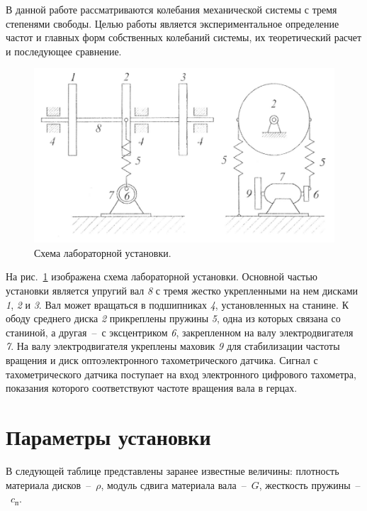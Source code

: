 \documentclass[12pt, a4paper]{article}
\begin{document}
    В данной работе рассматриваются колебания механической системы с тремя степенями свободы. Целью работы является экспериментальное определение частот и главных форм собственных колебаний системы, их теоретический расчет и последующее сравнение.
    
    \begin{figure} [h]
        \centering
        \includegraphics [width = 12cm] {Lab_4_1.png}
        \caption{\centering Схема лабораторной установки.}
        \label{im1}
    \end{figure}
    
    На рис.~\ref{im1} изображена схема лабораторной установки. Основной частью установки является упругий вал \textit{8} с тремя жестко укрепленными на нем дисками \textit{1}, \textit{2} и \textit{3}. Вал может вращаться в подшипниках \textit{4}, установленных на станине. К ободу среднего диска \textit{2} прикреплены пружины \textit{5}, одна из которых связана со станиной, а другая~--~с эксцентриком \textit{6}, закрепленном на валу электродвигателя \textit{7}. На валу электродвигателя укреплены маховик \textit{9} для стабилизации частоты вращения и диск оптоэлектронного тахометрического датчика. Сигнал с тахометрического датчика поступает на вход электронного цифрового тахометра, показания которого соответствуют частоте вращения вала в герцах.
    
    \newpage
    
    \section{Параметры установки}
    
    В следующей таблице представлены заранее известные величины: плотность материала дисков~--~$\rho$, модуль сдвига материала вала~--~$G$, жесткость пружины~--~$c_{\text{п}}$.
    
\end{document}
